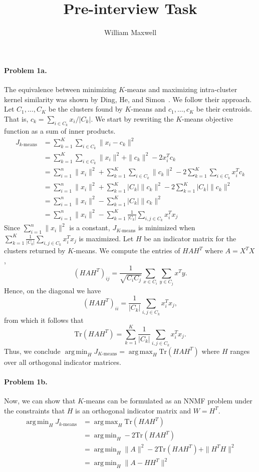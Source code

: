 \documentclass[12pt]{article}
\newcommand{\Tr}{\mathrm{Tr}}
\DeclareMathOperator*{\argmax}{arg\,max}
\DeclareMathOperator*{\argmin}{arg\,min}
\begin{document}
\title{Pre-interview Task}
\author{William Maxwell} 
\maketitle
\paragraph{Problem 1a.}
The equivalence between minimizing $K$-means and maximizing intra-cluster kernel similarity was shown by Ding, He, and Simon~\cite{Ding2005}. 
We follow their approach. Let $C_1,\dots,C_K$ be the clusters found by $K$-means and $c_1,\dots,c_K$ be their centroids. That is, $c_k = \sum_{i \in C_k} x_i/|C_k|$. We start by rewriting the $K$-means objective function as a sum of inner products.
\begin{align*}
J_{k\text{-means}} &= \sum_{k=1}^K \sum_{i \in C_k} \|x_i - c_k\|^2\\
 &= \sum_{k=1}^K \sum_{i \in C_k} \|x_i\|^2 + \|c_k\|^2 - 2x_i^T c_k \\
&= \sum_{i=1}^n \|x_i\|^2 + \sum_{k=1}^K \sum_{i \in C_k} \|c_k\|^2 - 2 \sum_{k=1}^K \sum_{i \in C_k} x_i^T c_k \\
&= \sum_{i=1}^n \|x_i\|^2 + \sum_{k=1}^K |C_k| \|c_k\|^2 - 2 \sum_{k=1}^K |C_k| \|c_k\|^2 \\
&= \sum_{i=1}^n \|x_i\|^2 - \sum_{k=1}^K |C_k|\|c_k\|^2\\
&= \sum_{i=1}^n \|x_i\|^2 - \sum_{k=1}^K \frac{1}{|C_k|} \sum_{i, j \in C_k} x_i^T x_j
\end{align*}
Since $\sum_{i=1}^n \|x_i\|^2$ is a constant, $J_{K\text{-means}}$ is minimized when $\sum_{k=1}^K \frac{1}{|C_k|} \sum_{i, j \in C_k} x_i^T x_j$ is maximized. Let $H$ be an indicator matrix for the clusters returned by $K$-means. We compute the entries of $HAH^T$ where $A=X^TX$, \[(HAH^T)_{ij} =  \frac{1}{\sqrt{C_i C_j}} \sum_{x \in C_i}\sum_{y \in C_j} x^T y. \] Hence, on the diagonal we have \[(HAH^T)_{ii} =  \frac{1}{|C_k|} \sum_{i, j \in C_k} x_i^T x_j, \] from which it follows that \[ \Tr(HAH^T) = \sum_{k=1}^K \frac{1}{|C_k|} \sum_{i, j \in C_k} x_i^T x_j.\]
Thus, we conclude $\argmin_{H} J_{K\text{-means}} = \argmax_H \Tr(HAH^T)$ where $H$ ranges over all orthogonal indicator matrices.

\paragraph{Problem 1b.}
Now, we can show that $K$-means can be formulated as an NNMF problem under the constraints that $H$ is an orthogonal indicator matrix and $W = H^T$.
\begin{align*}
\argmin_{H} J_{k\text{-means}} &= \argmax_H \Tr(HAH^T) \\
&= \argmin_H -2\Tr(HAH^T) \\
&= \argmin_H \|A\|^2 -2 \Tr(HAH^T) + \|H^TH\|^2 \\
&= \argmin_H \|A - HH^T\|^2
\end{align*}
\end{document}

